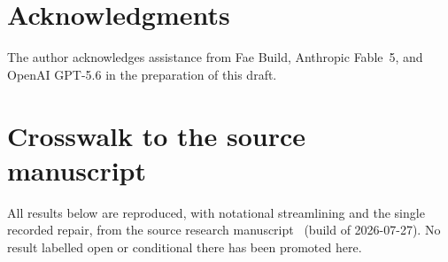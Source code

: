 \documentclass[11pt,reqno]{amsart}
\theoremstyle{definition}
\theoremstyle{remark}
\begin{document}





\section*{Acknowledgments}
The author acknowledges assistance from Fae Build, Anthropic Fable~5, and
OpenAI GPT-5.6 in the preparation of this draft.

\appendix

\section{Crosswalk to the source manuscript}\label{sec:crosswalk}
All results below are reproduced, with notational streamlining and the single
recorded repair, from the source research manuscript~\cite{MWman} (build of
2026-07-27).  No result labelled open or conditional there has been promoted
here.
\end{document}
